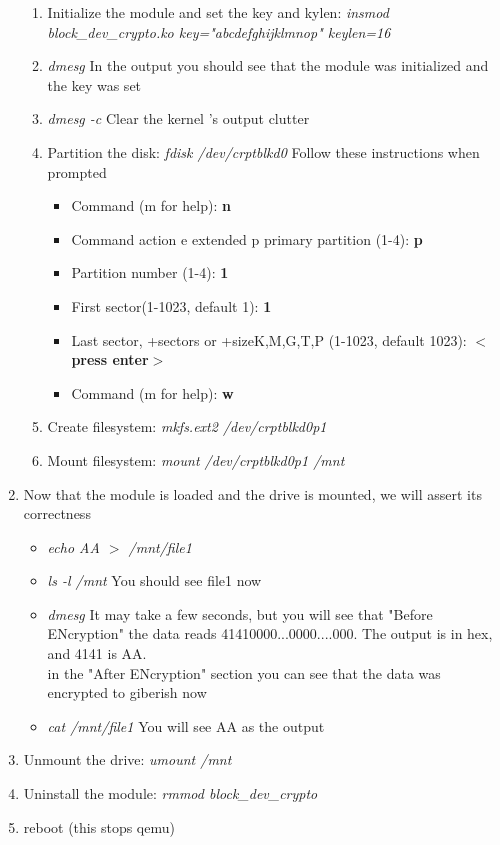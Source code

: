 \documentclass[draftclsnofoot, onecolumn, 10pt, compsoc]{IEEEtran}
\begin{document}
\begin{enumerate}
\begin{enumerate}
					\item Initialize the module and set the key and kylen: \textit{insmod block\_dev\_crypto.ko key="abcdefghijklmnop" keylen=16}
					\item \textit{dmesg} In the output you should see that the module was initialized and the key was set
					\item \textit{dmesg -c} Clear the kernel 's output clutter
					\item Partition the disk:\textit{ fdisk /dev/crptblkd0}
						Follow these instructions when prompted
						\begin{itemize}
							\item Command (m for help): \textbf{n}
							\item Command action
   e extended
   p primary partition (1-4):
\textbf{p}
							\item Partition number (1-4): \textbf{1}
							\item First sector(1-1023, default 1): \textbf{1}
							\item Last sector, +sectors or +size{K,M,G,T,P} (1-1023, default 1023): \textbf{$<$press enter$>$}
							\item Command (m for help): \textbf{w}
						\end{itemize}
					\item Create filesystem: \textit{mkfs.ext2 /dev/crptblkd0p1}
					\item Mount filesystem: \textit{mount /dev/crptblkd0p1 /mnt}
				\end{enumerate}
				\item Now that the module is loaded and the drive is mounted, we will assert its correctness
				\begin{itemize}
					\item \textit{echo AA $>$ /mnt/file1}
					\item \textit{ls -l /mnt} You should see file1 now
					\item \textit{dmesg} It may take a few seconds, but you will see that "Before ENcryption" the data reads 41410000...0000....000. The output is in hex, and 4141 is AA. \\
					in the "After ENcryption" section you can see that the data was encrypted to giberish now
					\item \textit{cat /mnt/file1} You will see AA as the output
				\end{itemize}
				\item Unmount the drive: \textit{umount /mnt}
				\item Uninstall the module: \textit{rmmod block\_dev\_crypto}
				\item reboot (this stops qemu)
			\end{enumerate}
\end{document}
